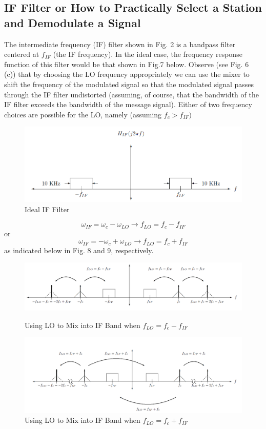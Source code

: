 \documentclass[12pt]{article}
\begin{document}
\subsection{IF Filter or How to Practically Select a Station and Demodulate a Signal}
The intermediate frequency (IF) filter shown in Fig. 2 is a bandpass filter centered at $f_{IF}$ (the IF
frequency). In the ideal case, the frequency response function of this filter would be that shown in Fig.7
below. Observe (see Fig. 6 (c)) that by choosing the LO frequency appropriately we can use the mixer to shift the frequency of the modulated signal so that the modulated signal passes through the IF filter
undistorted (assuming, of course, that the bandwidth of the IF filter exceeds the bandwidth of the message
signal). Either of two frequency choices are possible for the LO, namely (assuming $f_c>f_{IF})$
\begin{figure}[H]
\centering
\includegraphics[scale=0.5]{P7.jpg}
\caption{Ideal IF Filter}
\end{figure}
\begin{equation}
\omega_{IF}=\omega_c-\omega_{LO}\rightarrow f_{LO}=f_c-f_{IF}
\end{equation}
or
\begin{equation}
\omega_{IF}=-\omega_c+\omega_{LO}\rightarrow f_{LO}=f_c+f_{IF}
\end{equation}
as indicated below in Fig. 8 and 9, respectively.
\begin{figure}[H]
\centering
\includegraphics[scale=0.5]{P8.jpg}
\caption{Using LO to Mix into IF Band when $f_{LO}=f_c-f_{IF}$}
\includegraphics[scale=0.5]{P9.jpg}
\caption{Using LO to Mix into IF Band when $f_{LO}=f_c+f_{IF}$}
\end{figure}
\end{document}
